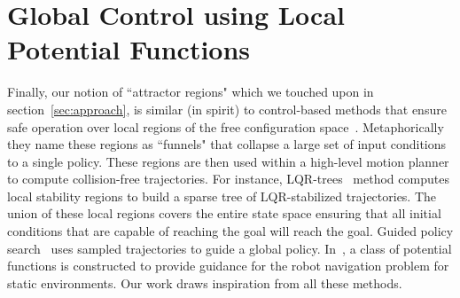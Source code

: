 \documentclass[a4paper]{report}
\begin{document}
\section{Global Control using Local Potential Functions}
Finally, our notion of ``attractor regions" which we touched upon in section~\ref{sec:approach}, is similar (in spirit) to control-based methods that  ensure safe operation over local regions of the free configuration space~\cite{CRC03,CCR06,atkeson2008random,tedrake2010lqr, majumdar2017funnel}. Metaphorically they name these regions as ``funnels" that collapse a large set of input conditions to a single policy.
These regions are then used within a high-level motion planner to compute collision-free trajectories. For instance, LQR-trees~\cite{tedrake2010lqr} method computes local stability regions to build a sparse tree of LQR-stabilized trajectories. The union of these local regions covers the entire state space ensuring that all initial conditions that are capable of reaching the goal will reach the goal.
Guided policy search~\cite{levine2013guided} uses sampled trajectories to guide a global policy.
In~\cite{koditschek1987exact}, a class of potential functions is constructed to provide guidance for the robot navigation problem for static environments.
Our work draws inspiration from all these methods.
\end{document}
